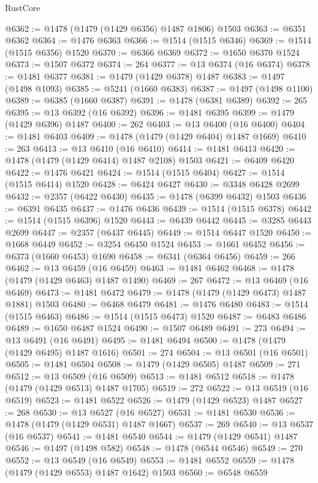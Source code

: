 \begin{lexlean}{RustCore}
\begin{coremodule}
@6362 := @1478 (@1479 (@1429 @6356) @1487 @1806) @1503
@6363 := @6351 @6362
@6364 := @1476 @6363
@6366 := @1514 (@1515 @6346)
@6369 := @1514 (@1515 @6356) @1520
@6370 := @6366 @6369
@6372 := @1650 @6370 @1524
@6373 := @1507 @6372
@6374 := 264
@6377 := @13 @6374 (@16 @6374)
@6378 := @1481 @6377
@6381 := @1479 (@1429 @6378) @1487
@6383 := @1497 (@1498 @1093)
@6385 := @5241 (@1660 @6383)
@6387 := @1497 (@1498 @1100)
@6389 := @6385 (@1660 @6387)
@6391 := @1478 (@6381 @6389)
@6392 := 265
@6395 := @13 @6392 (@16 @6392)
@6396 := @1481 @6395
@6399 := @1479 (@1429 @6396) @1487
@6400 := 262
@6403 := @13 @6400 (@16 @6400)
@6404 := @1481 @6403
@6409 := @1478 (@1479 (@1429 @6404) @1487 @1669)
@6410 := 263
@6413 := @13 @6410 (@16 @6410)
@6414 := @1481 @6413
@6420 := @1478 (@1479 (@1429 @6414) @1487 @2108) @1503
@6421 := @6409 @6420
@6422 := @1476 @6421
@6424 := @1514 (@1515 @6404)
@6427 := @1514 (@1515 @6414) @1520
@6428 := @6424 @6427
@6430 := @3348 @6428 @2699
@6432 := @2357 (@6422 @6430)
@6435 := @1478 (@6399 @6432) @1503
@6436 := @6391 @6435
@6437 := @1476 @6436
@6439 := @1514 (@1515 @6378)
@6442 := @1514 (@1515 @6396) @1520
@6443 := @6439 @6442
@6445 := @3285 @6443 @2699
@6447 := @2357 (@6437 @6445)
@6449 := @1514 @6447 @1520
@6450 := @1668 @6449
@6452 := @3254 @6450 @1524
@6453 := @1661 @6452
@6456 := @6373 (@1660 @6453) @1690
@6458 := @6341 (@6364 @6456)
@6459 := 266
@6462 := @13 @6459 (@16 @6459)
@6463 := @1481 @6462
@6468 := @1478 (@1479 (@1429 @6463) @1487 @1490)
@6469 := 267
@6472 := @13 @6469 (@16 @6469)
@6473 := @1481 @6472
@6479 := @1478 (@1479 (@1429 @6473) @1487 @1881) @1503
@6480 := @6468 @6479
@6481 := @1476 @6480
@6483 := @1514 (@1515 @6463)
@6486 := @1514 (@1515 @6473) @1520
@6487 := @6483 @6486
@6489 := @1650 @6487 @1524
@6490 := @1507 @6489
@6491 := 273
@6494 := @13 @6491 (@16 @6491)
@6495 := @1481 @6494
@6500 := @1478 (@1479 (@1429 @6495) @1487 @1616)
@6501 := 274
@6504 := @13 @6501 (@16 @6501)
@6505 := @1481 @6504
@6508 := @1479 (@1429 @6505) @1487
@6509 := 271
@6512 := @13 @6509 (@16 @6509)
@6513 := @1481 @6512
@6518 := @1478 (@1479 (@1429 @6513) @1487 @1705)
@6519 := 272
@6522 := @13 @6519 (@16 @6519)
@6523 := @1481 @6522
@6526 := @1479 (@1429 @6523) @1487
@6527 := 268
@6530 := @13 @6527 (@16 @6527)
@6531 := @1481 @6530
@6536 := @1478 (@1479 (@1429 @6531) @1487 @1667)
@6537 := 269
@6540 := @13 @6537 (@16 @6537)
@6541 := @1481 @6540
@6544 := @1479 (@1429 @6541) @1487
@6546 := @1497 (@1498 @582)
@6548 := @1478 (@6544 @6546)
@6549 := 270
@6552 := @13 @6549 (@16 @6549)
@6553 := @1481 @6552
@6559 := @1478 (@1479 (@1429 @6553) @1487 @1642) @1503
@6560 := @6548 @6559

\end{coremodule}
\end{lexlean}
